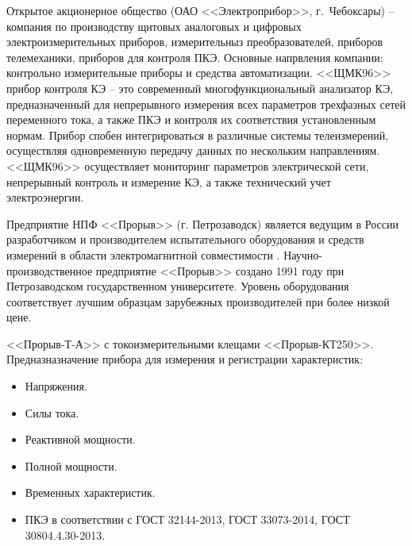 Открытое акционерное общество (ОАО <<Электроприбор>>, г.~Чебоксары) – компания по производству щитовых аналоговых и цифровых электроизмерительных приборов, измерительныз преобразователей, приборов телемеханики, приборов для контроля ПКЭ. Основные напрвления компании: контрольно измерительные приборы и средства автоматизации.
<<ЩМК96>> прибор контроля КЭ – это современный многофункциональный анализатор КЭ, предназначенный для непрерывного измерения всех параметров трехфазных сетей переменного тока, а также ПКЭ и контроля их соответствия установленным нормам. Прибор спобен интегрироваться в различные системы телеизмерений, осуществляя одновременную передачу данных по нескольким направлениям. <<ЩМК96>> осуществляет мониторинг параметров электрической сети, непрерывный контроль и измерение КЭ, а также технический учет электроэнергии.

Предприятие НПФ <<Прорыв>> (г. Петрозаводск) является ведущим в России разработчиком и производителем испытательного оборудования и средств измерений в области электромагнитной совместимости \cite{breakthrough}. 
Научно-производственное предприятие <<Прорыв>> создано 1991 году при Петрозаводском государственном университете. Уровень оборудования соответствует лучшим образцам зарубежных производителей при более низкой цене.

<<Прорыв-Т-А>> с токоизмерительными клещами <<Прорыв-КТ250>>.
Предназназначение прибора для измерения и регистрации характеристик:
\begin{itemize}
	\item Напряжения.
	\item Силы тока.
	\item Реактивной мощности.
	\item Полной мощности.
	\item Временных характеристик.
	\item ПКЭ в соответствии с ГОСТ 32144-2013, ГОСТ 33073-2014, ГОСТ 30804.4.30-2013.
\end{itemize}

